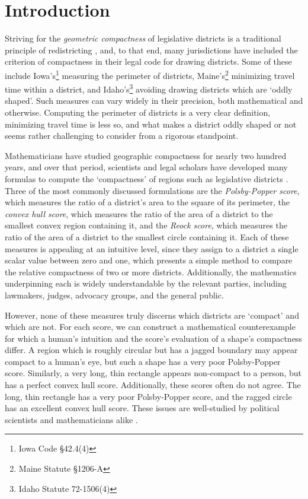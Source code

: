 \section{Introduction}
Striving for the \textit{geometric compactness} of legislative
districts is a traditional principle of redistricting \cite{altman_1998}, and, to that
end, many jurisdictions have included the criterion of compactness in
their legal code for drawing districts.  Some of these include Iowa's\footnote{Iowa Code \S42.4(4)} measuring the perimeter of districts, Maine's\footnote{Maine Statute \S1206-A} minimizing travel time within a district, and Idaho's\footnote{Idaho Statute 72-1506(4)} avoiding 
drawing districts which are `oddly shaped'.  Such measures can vary widely in their 
precision, both mathematical and otherwise.  Computing the perimeter of districts is a very clear definition, minimizing travel time is less so, and what makes a district oddly shaped or not seems rather challenging to consider from a rigorous standpoint. 


Mathematicians have studied geographic compactness for nearly two hundred years, and over that period, scientists and legal scholars have developed many formulas to compute the `compactness' of regions such as legislative districts \cite{young_compactness}.
 Three of the most commonly discussed formulations are the \textit{Polsby-Popper score}, which
measures the ratio of a district's area to the square of its
perimeter, the \textit{convex hull score}, which measures the ratio
of the area of a district to the smallest convex region containing it,
and the \textit{Reock score}, which measures the ratio of the area of
a district to the smallest circle containing it.  Each of these
measures is appealing at an intuitive level, since they assign to
a district a single scalar value between zero and one, which presents a simple 
method to compare the relative compactness of two or more districts. 
Additionally, the
mathematics underpinning each is widely understandable by the relevant
parties, including lawmakers, judges, advocacy groups, and the general
public.  

However, none of these measures truly discerns which districts are `compact' and which are not. 
For each score, we can construct a 
mathematical counterexample for which
a human's intuition and the score's evaluation of a shape's
compactness differ.  A region which is roughly circular but has a jagged boundary 
may appear compact to a human's eye, but such a shape has a very poor Polsby-Popper score.  Similarly, a very long, thin rectangle appears non-compact to a person, but has a perfect convex hull score.  Additionally, these scores often do not agree.
The long, thin rectangle has a  very
poor Polsby-Popper score, and the ragged circle has an excellent convex hull score.  These issues are well-studied by political
scientists and mathematicians alike
\cite{polsby1991third,frolov1975shape,maceachren1985compact}.




